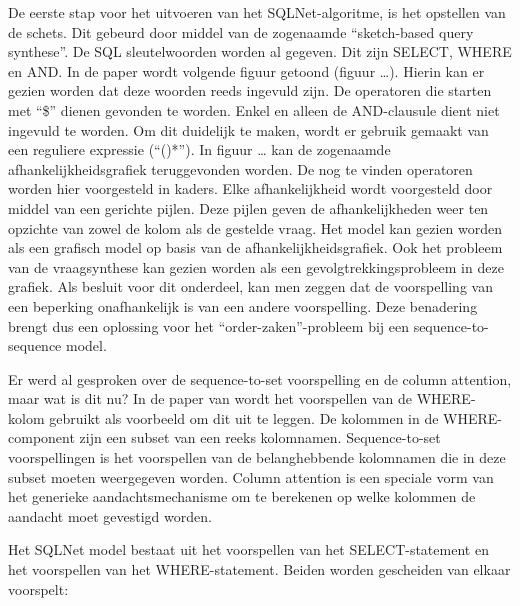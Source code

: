 De eerste stap voor het uitvoeren van het SQLNet-algoritme, is het opstellen van de schets. Dit gebeurd door middel van de zogenaamde “sketch-based query synthese”. De SQL sleutelwoorden worden al gegeven. Dit zijn SELECT, WHERE en AND. In de paper wordt volgende figuur getoond (figuur …). Hierin kan er gezien worden dat deze woorden reeds ingevuld zijn. De operatoren die starten met “\$” dienen gevonden te worden. Enkel en alleen de AND-clausule dient niet ingevuld te worden. Om dit duidelijk te maken, wordt er gebruik gemaakt van een reguliere expressie (“()*”). In figuur … kan de zogenaamde afhankelijkheidsgrafiek teruggevonden worden. De nog te vinden operatoren worden hier voorgesteld in kaders. Elke afhankelijkheid wordt voorgesteld door middel van een gerichte pijlen. Deze pijlen geven de afhankelijkheden weer ten opzichte van zowel de kolom als de gestelde vraag. Het model kan gezien worden als een grafisch model op basis van de afhankelijkheidsgrafiek. Ook het probleem van de vraagsynthese kan gezien worden als een gevolgtrekkingsprobleem in deze grafiek. Als besluit voor dit onderdeel, kan men zeggen dat de voorspelling van een beperking onafhankelijk is van een andere voorspelling. Deze benadering brengt dus een oplossing voor het “order-zaken”-probleem bij een sequence-to-sequence model.

Er werd al gesproken over de sequence-to-set voorspelling en de column attention, maar wat is dit nu? In de paper van \textcite{sqlnetPaper} wordt het voorspellen van de WHERE-kolom gebruikt als voorbeeld om dit uit te leggen. De kolommen in de WHERE-component zijn een subset van een reeks kolomnamen. Sequence-to-set voorspellingen is het voorspellen van de belanghebbende kolomnamen die in deze subset moeten weergegeven worden. Column attention is een speciale vorm van het generieke aandachtsmechanisme om te berekenen op welke kolommen de aandacht moet gevestigd worden. 

Het SQLNet model bestaat uit het voorspellen van het SELECT-statement en het voorspellen van het WHERE-statement. Beiden worden gescheiden van elkaar voorspelt:

